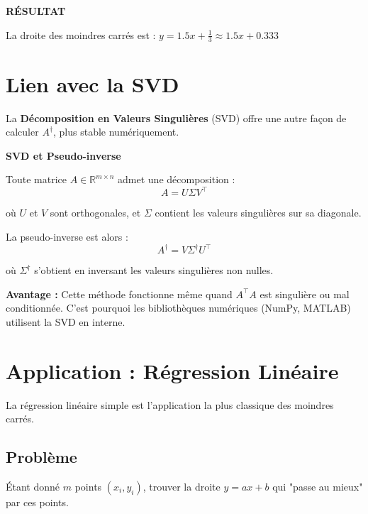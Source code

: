 \documentclass[12pt,a4paper]{article}
\newcommand{\R}{\mathbb{R}}
\newcommand{\T}{^\top}
\newcommand{\pinv}{^\dagger}
\begin{document}
\begin{resultatbox}
\begin{center}
\textbf{\textcolor{bleu}{RÉSULTAT}}

La droite des moindres carrés est : $\boxed{y = 1.5x + \frac{1}{3} \approx 1.5x + 0.333}$
\end{center}
\end{resultatbox}

\newpage
\section{Lien avec la SVD}

La \textbf{Décomposition en Valeurs Singulières} (SVD) offre une autre façon de calculer $A\pinv$, plus stable numériquement.

\begin{theorembox}
\textbf{SVD et Pseudo-inverse}

Toute matrice $A \in \R^{m \times n}$ admet une décomposition :
\begin{equation}
A = U \Sigma V\T
\end{equation}

où $U$ et $V$ sont orthogonales, et $\Sigma$ contient les valeurs singulières sur sa diagonale.

La pseudo-inverse est alors :
\begin{equation}
A\pinv = V \Sigma\pinv U\T
\end{equation}

où $\Sigma\pinv$ s'obtient en inversant les valeurs singulières non nulles.
\end{theorembox}

\textbf{Avantage :} Cette méthode fonctionne même quand $A\T A$ est singulière ou mal conditionnée. C'est pourquoi les bibliothèques numériques (NumPy, MATLAB) utilisent la SVD en interne.

\section{Application : Régression Linéaire}

La régression linéaire simple est l'application la plus classique des moindres carrés.

\subsection{Problème}

Étant donné $m$ points $(x_i, y_i)$, trouver la droite $y = ax + b$ qui "passe au mieux" par ces points.
\end{document}
